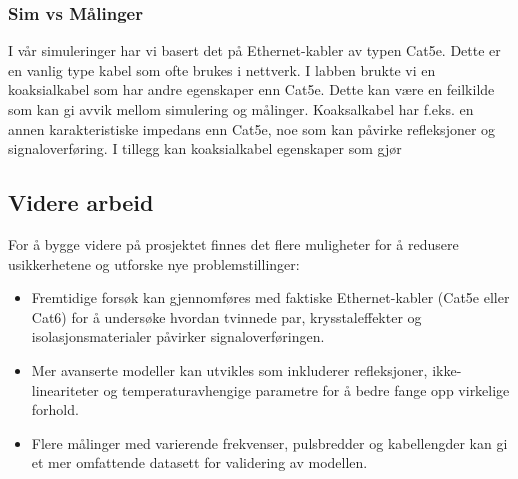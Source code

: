 \subsubsection{Sim vs Målinger}
I vår simuleringer har vi basert det på Ethernet-kabler av typen Cat5e. Dette er en vanlig type kabel som ofte brukes i nettverk. I labben brukte vi en koaksialkabel som har andre egenskaper enn Cat5e. Dette kan være en feilkilde som kan gi avvik mellom simulering og målinger. Koaksalkabel har f.eks. en annen karakteristiske impedans enn Cat5e, noe som kan påvirke refleksjoner og signaloverføring. I tillegg kan koaksialkabel egenskaper som gjør 

\subsection{Videre arbeid}
For å bygge videre på prosjektet finnes det flere muligheter for å redusere usikkerhetene og utforske nye problemstillinger:
\begin{itemize}
    \item Fremtidige forsøk kan gjennomføres med faktiske Ethernet-kabler (Cat5e eller Cat6) for å undersøke hvordan tvinnede par, krysstaleffekter og isolasjonsmaterialer påvirker signaloverføringen.
    \item Mer avanserte modeller kan utvikles som inkluderer refleksjoner, ikke-lineariteter og temperaturavhengige parametre for å bedre fange opp virkelige forhold.
    \item Flere målinger med varierende frekvenser, pulsbredder og kabellengder kan gi et mer omfattende datasett for validering av modellen.
\end{itemize}